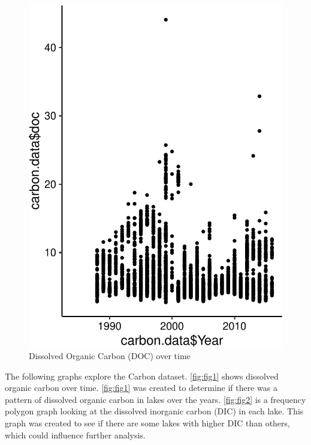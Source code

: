 \documentclass[12pt,]{article}
\newenvironment{Shaded}{\begin{snugshade}}{\end{snugshade}}
\newcommand{\KeywordTok}[1]{\textcolor[rgb]{0.13,0.29,0.53}{\textbf{#1}}}
\newcommand{\DataTypeTok}[1]{\textcolor[rgb]{0.13,0.29,0.53}{#1}}
\newcommand{\DecValTok}[1]{\textcolor[rgb]{0.00,0.00,0.81}{#1}}
\newcommand{\StringTok}[1]{\textcolor[rgb]{0.31,0.60,0.02}{#1}}
\newcommand{\CommentTok}[1]{\textcolor[rgb]{0.56,0.35,0.01}{\textit{#1}}}
\newcommand{\OperatorTok}[1]{\textcolor[rgb]{0.81,0.36,0.00}{\textbf{#1}}}
\newcommand{\NormalTok}[1]{#1}
\begin{document}
\begin{figure}
\centering
\includegraphics{Watson_ENV872_Project_files/figure-latex/unnamed-chunk-3-1.pdf}
\caption{\label{fig:fig1}Dissolved Organic Carbon (DOC) over time}
\end{figure}

The following graphs explore the Carbon dataset. \autoref{fig:fig1}
shows dissolved organic carbon over time. \autoref{fig:fig1} was created
to determine if there was a pattern of dissolved organic carbon in lakes
over the years. \autoref{fig:fig2} is a frequency polygon graph looking
at the dissolved inorganic carbon (DIC) in each lake. This graph was
created to see if there are some lakes with higher DIC than others,
which could influence further analysis.

\begin{Shaded}
\end{Shaded}
\end{document}
